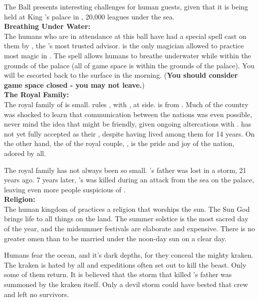 \documentclass[blue]{NeptuneBall}
\begin{document}
\name{\bHuman{}}

The \cExExKing{} Ball presents interesting challenges for human guests, given that it is being held at King \cKing{\MYname{}}'s palace in \pAtlantis{}, 20,000 leagues under the sea.\\

{\bf Breathing Under Water:}\\
The humans who are in attendance at this ball have had a special spell cast on them by \cManta{}, the \cKing{\King}'s most trusted advisor. \cManta{} is the only magician allowed to practice most magic in \pAtlantis{}. The spell allows humans to breathe underwater while within the grounds of the palace (all of game space is within  the grounds of the palace). You will be escorted back to the surface in the morning. ({\bf You should consider game space closed - you may not leave.})\\

{\bf The Royal Family:}\\
The royal family of \pAmerica{} is small. \cEric{\King} \cEric{} rules \pAmerica{}, with \cEric{\their} \cAriel{\spouse}, \cAriel{\King} \cAriel{} at \cEric{\their} side. \cAriel{} is from \pAtlantis{}. Much of the country was shocked to learn that communication between the nations was even possible, never mind the idea that \pAtlantis{} might be friendly, given ongoing altercations with \pPacifica{}. \pAmerica{} has not yet fully accepted \cAriel{} as their \cAriel{\King}, despite \cAriel{\their} having lived among them for 14 years. On the other hand, the \cWillow{\offspring} of the royal couple, \cWillow{\Prince} \cWillow{}, is the pride and joy of the nation, adored by all.

The royal family has not always been so small. \cEric{}'s father was lost in a storm, 21 years ago. 7 years later, \cEric{}'s \cSlave{\sibling} was killed during an attack from the sea on the palace, leaving even more people suspicious of \cAriel{\King} \cAriel{}.\\

{\bf Religion:}\\
The human kingdom of \pAmerica{} practices a religion that worships the sun. The Sun God brings life to all things on the land. The summer solstice is the most sacred day of the year, and the midsummer festivals are elaborate and expensive. There is no greater omen than to be married under the noon-day sun on a clear day.

Humans fear the ocean, and it's dark depths, for they conceal the mighty kraken. The kraken is hated by all and expeditions often set out to kill the beast. Only some of them return. It is believed that the storm that killed \cEric{}'s father was summoned by the kraken itself. Only a devil storm could have bested that crew and left no survivors.\\
\end{document}
